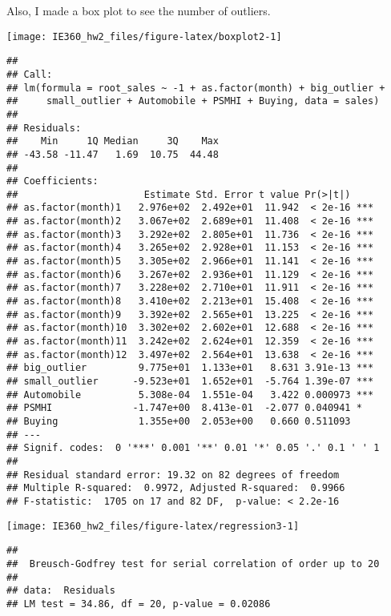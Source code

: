 \documentclass[
]{article}
\begin{document}
Also, I made a box plot to see the number of outliers.

\begin{center}\texttt{[image: IE360\_hw2\_files/figure-latex/boxplot2-1]} \end{center}

\begin{verbatim}
## 
## Call:
## lm(formula = root_sales ~ -1 + as.factor(month) + big_outlier + 
##     small_outlier + Automobile + PSMHI + Buying, data = sales)
## 
## Residuals:
##    Min     1Q Median     3Q    Max 
## -43.58 -11.47   1.69  10.75  44.48 
## 
## Coefficients:
##                      Estimate Std. Error t value Pr(>|t|)    
## as.factor(month)1   2.976e+02  2.492e+01  11.942  < 2e-16 ***
## as.factor(month)2   3.067e+02  2.689e+01  11.408  < 2e-16 ***
## as.factor(month)3   3.292e+02  2.805e+01  11.736  < 2e-16 ***
## as.factor(month)4   3.265e+02  2.928e+01  11.153  < 2e-16 ***
## as.factor(month)5   3.305e+02  2.966e+01  11.141  < 2e-16 ***
## as.factor(month)6   3.267e+02  2.936e+01  11.129  < 2e-16 ***
## as.factor(month)7   3.228e+02  2.710e+01  11.911  < 2e-16 ***
## as.factor(month)8   3.410e+02  2.213e+01  15.408  < 2e-16 ***
## as.factor(month)9   3.392e+02  2.565e+01  13.225  < 2e-16 ***
## as.factor(month)10  3.302e+02  2.602e+01  12.688  < 2e-16 ***
## as.factor(month)11  3.242e+02  2.624e+01  12.359  < 2e-16 ***
## as.factor(month)12  3.497e+02  2.564e+01  13.638  < 2e-16 ***
## big_outlier         9.775e+01  1.133e+01   8.631 3.91e-13 ***
## small_outlier      -9.523e+01  1.652e+01  -5.764 1.39e-07 ***
## Automobile          5.308e-04  1.551e-04   3.422 0.000973 ***
## PSMHI              -1.747e+00  8.413e-01  -2.077 0.040941 *  
## Buying              1.355e+00  2.053e+00   0.660 0.511093    
## ---
## Signif. codes:  0 '***' 0.001 '**' 0.01 '*' 0.05 '.' 0.1 ' ' 1
## 
## Residual standard error: 19.32 on 82 degrees of freedom
## Multiple R-squared:  0.9972, Adjusted R-squared:  0.9966 
## F-statistic:  1705 on 17 and 82 DF,  p-value: < 2.2e-16
\end{verbatim}

\begin{center}\texttt{[image: IE360\_hw2\_files/figure-latex/regression3-1]} \end{center}

\begin{verbatim}
## 
##  Breusch-Godfrey test for serial correlation of order up to 20
## 
## data:  Residuals
## LM test = 34.86, df = 20, p-value = 0.02086
\end{verbatim}
\end{document}
